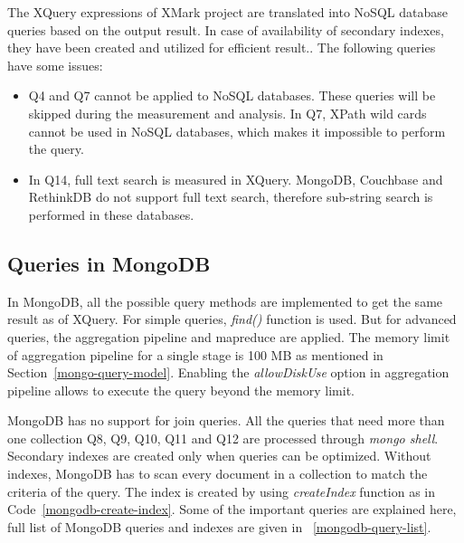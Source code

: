 The XQuery expressions of XMark project are translated into NoSQL database queries based on the output result. In case of availability of secondary indexes, they have been created and utilized for efficient result..
 The following queries have some issues:
\begin{itemize}
\item Q4 and Q7 cannot be applied to NoSQL databases. These queries will be skipped during the measurement and analysis. In Q7, XPath  wild cards cannot be used in NoSQL databases, which makes it impossible to perform the query. 

\item In Q14, full text search is measured in XQuery. MongoDB, Couchbase and RethinkDB do not support full text search, therefore  sub-string search is performed in these databases. 
\end{itemize}

\subsection{Queries in MongoDB}

In MongoDB, all the possible query methods are implemented to get the same result as of XQuery. For simple queries, \textit{find()} function is used. But for advanced queries, the aggregation pipeline and mapreduce are applied. The memory limit of aggregation pipeline for a single stage is 100 MB as mentioned in Section~\ref{mongo-query-model}. Enabling the \textit{allowDiskUse} option in aggregation pipeline allows to execute the query beyond the memory limit.

MongoDB has no support for join queries. All the queries that need more than one collection  Q8, Q9, Q10, Q11 and Q12  are processed through \textit{mongo shell}. Secondary indexes are created only when queries can be optimized. Without indexes, MongoDB has to scan every document in a collection to match the criteria of the query. The index is created by using \textit{createIndex} function as in Code~\ref{mongodb-create-index}. Some of the important queries are explained here, full list of MongoDB queries and indexes are given in ~\ref{mongodb-query-list}.

